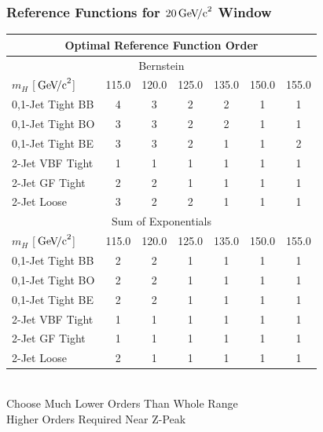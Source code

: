 \documentclass{beamer}
\newcommand{\GeVcc}{\ensuremath{\,\mathrm{Ge\kern -0.1em V\!/c}^2}}
\begin{document}
\begin{frame}
\frametitle{Reference Functions for $20\GeVcc{}$ Window}
\scriptsize
\begin{center}
\begin{tabular}{|l|c|c|c|c|c|c|} \hline
\multicolumn{7}{|c|}{ \bf Optimal Reference Function Order} \\ \hline
\multicolumn{7}{|c|}{Bernstein} \\ \hline
$m_H$ [\GeVcc{}]                     &    115.0 &    120.0 &    125.0 &    135.0 &    150.0 &    155.0 \\ \hline
0,1-Jet Tight BB     &        4 &        3 &        2 &        2 &        1 &        1 \\ \hline
0,1-Jet Tight BO     &        3 &        3 &        2 &        2 &        1 &        1 \\ \hline
0,1-Jet Tight BE     &        3 &        3 &        2 &        1 &        1 &        2 \\ \hline
2-Jet VBF Tight      &        1 &        1 &        1 &        1 &        1 &        1 \\ \hline
2-Jet GF Tight       &        2 &        2 &        1 &        1 &        1 &        1 \\ \hline
2-Jet Loose          &        3 &        2 &        2 &        1 &        1 &        1 \\ \hline
\multicolumn{7}{|c|}{Sum of Exponentials} \\ \hline
$m_H$ [\GeVcc{}]                    &    115.0 &    120.0 &    125.0 &    135.0 &    150.0 &    155.0 \\ \hline
0,1-Jet Tight BB     &        2 &        2 &        1 &        1 &        1 &        1 \\ \hline
0,1-Jet Tight BO     &        2 &        2 &        1 &        1 &        1 &        1 \\ \hline
0,1-Jet Tight BE     &        2 &        2 &        1 &        1 &        1 &        1 \\ \hline
2-Jet VBF Tight      &        1 &        1 &        1 &        1 &        1 &        1 \\ \hline
2-Jet GF Tight       &        1 &        1 &        1 &        1 &        1 &        1 \\ \hline
2-Jet Loose          &        2 &        1 &        1 &        1 &        1 &        1 \\ \hline
\end{tabular}
\\
\vspace{1ex}
Choose Much Lower Orders Than Whole Range
\\
Higher Orders Required Near Z-Peak
\end{center}
\end{frame}
\end{document}
